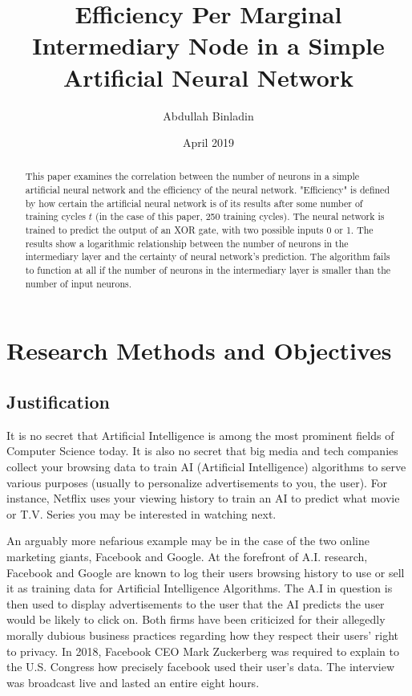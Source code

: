 \documentclass[12pt]{article}
\title{Efficiency Per Marginal Intermediary Node in a Simple Artificial Neural Network}
\author{Abdullah Binladin}
\date{April 2019}
\begin{document}
\maketitle

\begin{abstract}
This paper examines the correlation between the number of neurons in a simple artificial neural network and the efficiency of the neural network. "Efficiency" is defined by how certain the artificial neural network is of its results after some number of training cycles \begin{math}t\end{math} (in the case of this paper, 250 training cycles). The neural network is trained to predict the output of an XOR gate, with two possible inputs 0 or 1. The results show a logarithmic relationship between the number of neurons in the intermediary layer and the certainty of neural network's prediction. The algorithm fails to function at all if the number of neurons in the intermediary layer is smaller than the number of input neurons.
\end{abstract}

\tableofcontents
\pagebreak


\section{Research Methods and Objectives}

\subsection{Justification\label{history}}

It is no secret that Artificial Intelligence is among the most prominent fields of Computer Science today. It is also no secret that big media and tech
companies collect your browsing data to train AI (Artificial Intelligence) algorithms to serve various purposes (usually to personalize advertisements to you, the user). For instance, Netflix uses your viewing history to train an AI to predict what movie or T.V. Series you may be interested in watching next.

An arguably more nefarious example may be in the case of the two online marketing giants, Facebook and Google. At the forefront of A.I. research, Facebook and Google are known to log their users browsing history to use or sell it as training data for Artificial Intelligence Algorithms. The A.I in question is then used to display advertisements to the user that the AI predicts the user would be likely to click on. Both firms have been criticized for their allegedly morally dubious business practices regarding how they respect their users' right to privacy. In 2018, Facebook CEO Mark Zuckerberg was required to explain to the U.S. Congress how precisely facebook used their user's data. The interview was broadcast live and lasted an entire eight hours.
\end{document}
